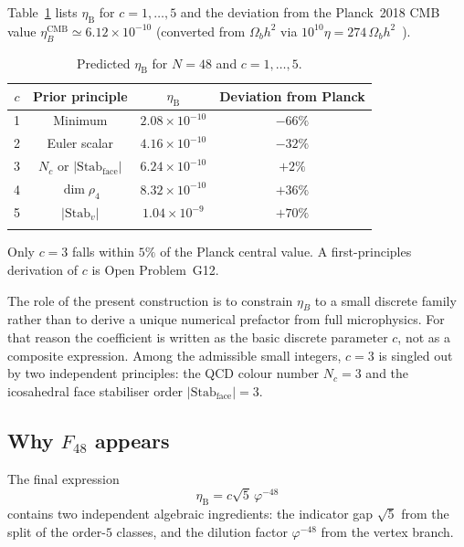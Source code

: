 \documentclass[sn-mathphys-num,Numbered]{sn-jnl}
\theoremstyle{thmstyleone}
\theoremstyle{thmstylethree}
\theoremstyle{thmstyletwo}
\newcommand{\etaB}{\eta_{\mathrm{B}}}
\begin{document}
Table~\ref{tab:prefactor} lists $\etaB$ for $c = 1,\ldots,5$ and the
deviation from the Planck~2018 CMB value
$\eta_B^{\mathrm{CMB}} \simeq 6.12\times10^{-10}$ (converted from
$\Omega_b h^2$ via $10^{10}\eta = 274\,\Omega_b h^2$~\cite{Planck2018,PDG2022}).

\begin{table}[h]
\caption{Predicted $\etaB$ for $N=48$ and $c=1,\ldots,5$.}
\label{tab:prefactor}
\begin{tabular}{@{}cccc@{}}
\toprule
$c$ & Prior principle & $\etaB$ & Deviation from Planck \\
\midrule
1 & Minimum & $2.08\times10^{-10}$ & $-66\%$ \\
2 & Euler scalar & $4.16\times10^{-10}$ & $-32\%$ \\
3 & $N_c$ or $|\mathrm{Stab}_{\mathrm{face}}|$ &
  $6.24\times10^{-10}$ & $+2\%$ \\
4 & $\dim\rho_4$ & $8.32\times10^{-10}$ & $+36\%$ \\
5 & $|\mathrm{Stab}_v|$ & $1.04\times10^{-9}$ & $+70\%$ \\
\botrule
\end{tabular}
\end{table}

Only $c=3$ falls within $5\%$ of the Planck central value.  A
first-principles derivation of $c$ is Open Problem~G12.

The role of the present construction is to constrain $\eta_B$ to a small
discrete family rather than to derive a unique numerical prefactor from
full microphysics. For that reason the coefficient is written as the
basic discrete parameter $c$, not as a composite expression. Among the
admissible small integers, $c=3$ is singled out by two independent
principles: the QCD colour number $N_c=3$ and the icosahedral face
stabiliser order $|\mathrm{Stab}_{\mathrm{face}}|=3$.

\subsection{Why $F_{48}$ appears}
\label{ssec:binet-confluence}

The final expression
\[
\etaB = c\sqrt{5}\,\varphi^{-48}
\]
contains two independent algebraic ingredients: the indicator gap
$\sqrt{5}$ from the split of the order-$5$ classes, and the dilution
factor $\varphi^{-48}$ from the vertex branch.
\end{document}
